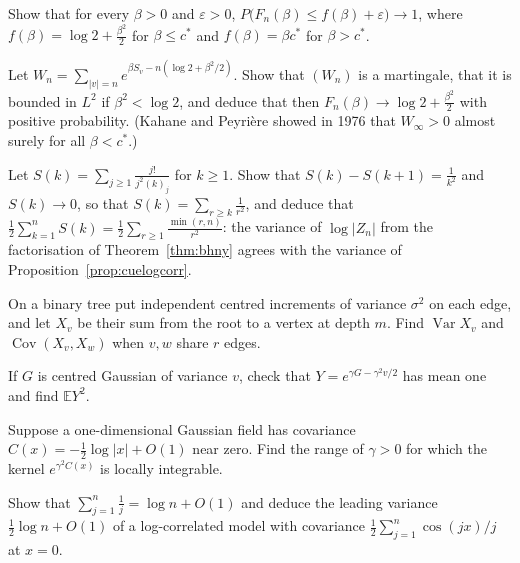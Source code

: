 \begin{exercise}[$\star\star$]\label{ex:freeup}
Show that for every $\beta>0$ and $\varepsilon>0$, $P\bigl(F_n(\beta)\le f(\beta)+\varepsilon\bigr)\to1$, where $f(\beta)=\log2+\frac{\beta^2}2$ for $\beta\le c^*$ and $f(\beta)=\beta c^*$ for $\beta>c^*$.
\end{exercise}

\begin{exercise}[$\star\star\star$]\label{ex:freelow}
Let $W_n=\sum_{|v|=n}e^{\beta S_v-n(\log2+\beta^2/2)}$. Show that $(W_n)$ is a martingale, that it is bounded in $L^2$ if $\beta^2<\log2$, and deduce that then $F_n(\beta)\to\log2+\frac{\beta^2}2$ with positive probability. (Kahane and Peyri\`ere showed in
1976 that $W_\infty>0$ almost surely for all $\beta<c^*$.)
\end{exercise}

\begin{exercise}[$\star\star$]\label{ex:twovariances}
Let $S(k)=\sum_{j\ge1}\frac{j!}{j^2(k)_j}$ for $k\ge1$. Show that $S(k)-S(k+1)=\frac1{k^2}$ and $S(k)\to0$, so that $S(k)=\sum_{r\ge k}\frac1{r^2}$, and deduce that $\frac12\sum_{k=1}^nS(k)=\frac12\sum_{r\ge1}\frac{\min(r,n)}{r^2}$: the variance of $\log|Z_n|$ from the factorisation of Theorem~\ref{thm:bhny} agrees with the variance of Proposition~\ref{prop:cuelogcorr}.
\end{exercise}

\begin{exercise}[$\star$]\label{ex:v12brwshared}
On a binary tree put independent centred increments of variance $\sigma^2$ on each edge, and let $X_v$ be their sum from the root to a vertex at depth $m$. Find $\operatorname{Var}X_v$ and $\operatorname{Cov}(X_v,X_w)$ when $v,w$ share $r$ edges.
\end{exercise}

\begin{exercise}[$\star$]\label{ex:v12chaosnorm}
If $G$ is centred Gaussian of variance $v$, check that $Y=e^{\gamma G-\gamma^2v/2}$ has mean one and find $\mathbb EY^2$.
\end{exercise}

\begin{exercise}[$\star\star$]\label{ex:v12gmcphase}
Suppose a one-dimensional Gaussian field has covariance $C(x)=-\frac12\log|x|+O(1)$ near zero. Find the range of $\gamma>0$ for which the kernel $e^{\gamma^2C(x)}$ is locally integrable.
\end{exercise}

\begin{exercise}[$\star\star\star$]\label{ex:v12harmoniclog}
Show that $\sum_{j=1}^n\frac1j=\log n+O(1)$ and deduce the leading variance $\frac12\log n+O(1)$ of a log-correlated model with covariance $\frac12\sum_{j=1}^n\cos(jx)/j$ at $x=0$.
\end{exercise}

